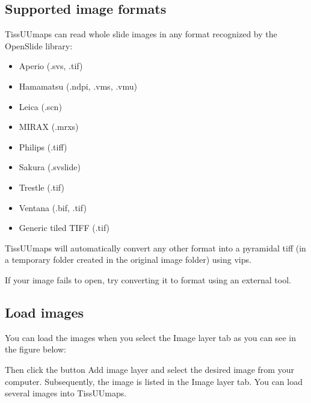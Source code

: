 \documentclass[letterpaper,10pt,english,openany,oneside]{sphinxmanual}
\begin{document}
\subsection{Supported image formats}
\label{\detokenize{docs/starting/images:supported-image-formats}}
\sphinxAtStartPar
TissUUmaps can read whole slide images in any format recognized by the OpenSlide library:
\begin{itemize}
\item {} 
\sphinxAtStartPar
Aperio (.svs, .tif)

\item {} 
\sphinxAtStartPar
Hamamatsu (.ndpi, .vms, .vmu)

\item {} 
\sphinxAtStartPar
Leica (.scn)

\item {} 
\sphinxAtStartPar
MIRAX (.mrxs)

\item {} 
\sphinxAtStartPar
Philips (.tiff)

\item {} 
\sphinxAtStartPar
Sakura (.svslide)

\item {} 
\sphinxAtStartPar
Trestle (.tif)

\item {} 
\sphinxAtStartPar
Ventana (.bif, .tif)

\item {} 
\sphinxAtStartPar
Generic tiled TIFF (.tif)

\end{itemize}

\sphinxAtStartPar
TissUUmaps will automatically convert any other format into a pyramidal tiff (in a temporary  folder created in the original image folder) using vips.

\sphinxAtStartPar
If your image fails to open, try converting it to  format using an external tool.


\subsection{Load images}
\label{\detokenize{docs/starting/images:load-images}}
\sphinxAtStartPar
You can load the images when you select the Image layer tab as you can see in the figure below:

\sphinxAtStartPar
Then click the button Add image layer and select the desired image from your computer. Subsequently, the image is listed in the Image layer tab. You can load several images into TissUUmaps.
\end{document}
